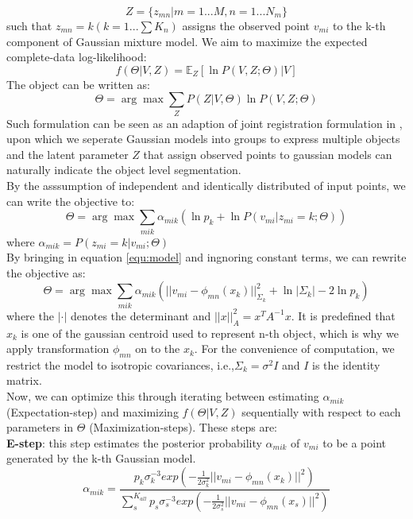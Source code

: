 $$Z=\{z_{mn}|m=1...M,n=1...N_m\}$$
such that $z_{mn}=k(k=1...\sum{K_n})$ assigns the observed point $v_{mi}$ to the k-th component of Gaussian mixture model. We aim to maximize the expected complete-data log-likelihood:
\begin{equation}
\label{equ:obj0}
f(\Theta|V,Z)=\mathbb{E}_Z[\ln P(V,Z;\Theta)|V]
\end{equation}
The object can be written as:
\begin{equation}
\label{equ:obj1}
\Theta=\arg\max{\sum_ZP(Z|V,\Theta)\ln{P(V,Z;\Theta)}}
\end{equation}
Such formulation can be seen as an adaption of joint registration formulation in \cite{Evangelidis2014}, upon which we seperate Gaussian models into groups to express multiple objects and the latent parameter  $Z$ that assign observed points to gaussian models can naturally indicate the object level segmentation.\\
By the asssumption of independent and identically distributed of input points, we can write the objective to:
\begin{equation}
\label{equ:obj2}
\Theta=\arg\max\sum_{mik}\alpha_{mik}(\ln p_k + \ln P(v_{mi}|z_{mi}=k;\Theta))
\end{equation}
where $\alpha_{mik} = P( z_{mi} = k | v_{mi} ; \Theta )$\\
By bringing in equation \ref{equ:model} and ingnoring constant terms, we can rewrite the objective as:
\begin{equation}
\label{equ:obj3}
\Theta=\arg\max\sum_{mik}\alpha_{mik}(||v_{mi}-\phi_{mn}(x_k)||_{\Sigma_k}^2 + \ln |\Sigma_k| - 2\ln p_k)
\end{equation}
where the $|\cdot|$ denotes the determinant and $||x||_A^2=x^TA^{-1}x$. It is predefined that $x_k$ is one of the gaussian centroid used to represent n-th object, which is why we apply transformation $\phi_{mn}$ on to the $x_k$. For the convenience of computation, we restrict the model to isotropic covariances, i.e.,$\Sigma_k=\sigma^2I$ and $I$ is the identity matrix.\\
Now, we can optimize this through iterating between estimating $\alpha_{mik}$ (Expectation-step) and maximizing $f(\Theta|V,Z)$ sequentially with respect to each parameters in $\Theta$ (Maximization-steps).
These steps are:\\
\textbf{E-step}:
this step estimates the posterior probability $\alpha_{mik}$ of $v_{mi}$ to be a point generated by the k-th Gaussian model.\\
\begin{equation}
\label{equ:estep}
\alpha_{mik}=\frac{p_k\sigma_k^{-3}exp(-\frac{1}{2\sigma_k^2}||v_{mi}-\phi_{mn}(x_k)||^2)}{\sum_s^{K_{all}}p_s\sigma_s^{-3}exp(-\frac{1}{2\sigma_s^2}||v_{mi}-\phi_{mn}(x_s)||^2)}
\end{equation}
